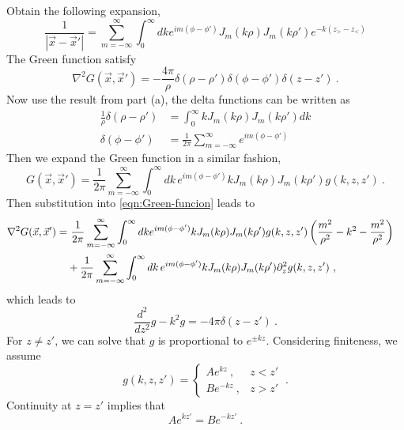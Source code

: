 \documentclass[12pt]{article}
\begin{document}
\newpage
{} Obtain the following expansion,
\begin{equation}
    \frac{1}{|\vec x- \vec x'|} = \sum_{m = - \infty}^\infty \int_0^\infty dk e^{im(\phi - \phi')} J_m(k\rho) J_m(k\rho') e^{-k(z_> - z_<)}
\end{equation}
The Green function satisfy
\begin{equation}\label{eqn:Green-funcion}
    \nabla^2 G(\vec x, \vec x') = - \frac{4\pi }{\rho} \delta(\rho - \rho') \delta(\phi - \phi') \delta(z - z')~.
\end{equation}
Now use the result from part (a), the delta functions can be written as
\begin{align}
    \frac{1}{\rho} \delta(\rho - \rho') &= \int_0^\infty k J_m(k \rho) J_m(k \rho') dk\\
    \delta(\phi-\phi') &= \frac{1}{2\pi} \sum_{m = - \infty}^\infty e^{im(\phi- \phi')}
\end{align}
Then we expand the Green function in a similar fashion,
\begin{equation}
    G(\vec x, \vec x') = \frac{1}{2\pi} \sum_{m = - \infty}^\infty \int_0^\infty dk\, e^{im(\phi - \phi')} k J_m(k \rho) J_m(k \rho') g(k, z, z')~.
\end{equation}
Then substitution into \eqref{eqn:Green-funcion} leads to
\begin{align}
    \nabla^2 G(\vec x, \vec x') =&~ \frac{1}{2\pi} \sum_{m = - \infty}^\infty \int_0^\infty dk e^{im(\phi - \phi')} k J_m(k \rho) J_m(k \rho') g(k, z, z')\left(\frac{m^2}{\rho^2} - k^2 - \frac{m^2}{\rho^2}\right)\cr
    &+\frac{1}{2\pi} \sum_{m = - \infty}^\infty \int_0^\infty dk\, e^{im(\phi - \phi')} k J_m(k \rho) J_m(k \rho')\partial^2_z g(k, z, z')~,
\end{align}
which leads to
\begin{equation} \label{eqn:differential-g}
    \frac{d^2}{dz^2} g - k^2 g = -4\pi \delta(z-z')~.
\end{equation}
For $z \neq z'$, we can solve that $g$ is proportional to $e^{\pm k z}$. Considering finiteness, we assume
\begin{equation}
    g(k,z,z') = \begin{cases}
        A e^{kz}~, & z < z'\\
        B e^{-kz}~, & z > z'
    \end{cases}~.
\end{equation}
Continuity at $z = z'$ implies that
\begin{equation}\label{eqn:eqn1}
    A e^{kz'} = B e^{-kz'}~.
\end{equation}
\end{document}
